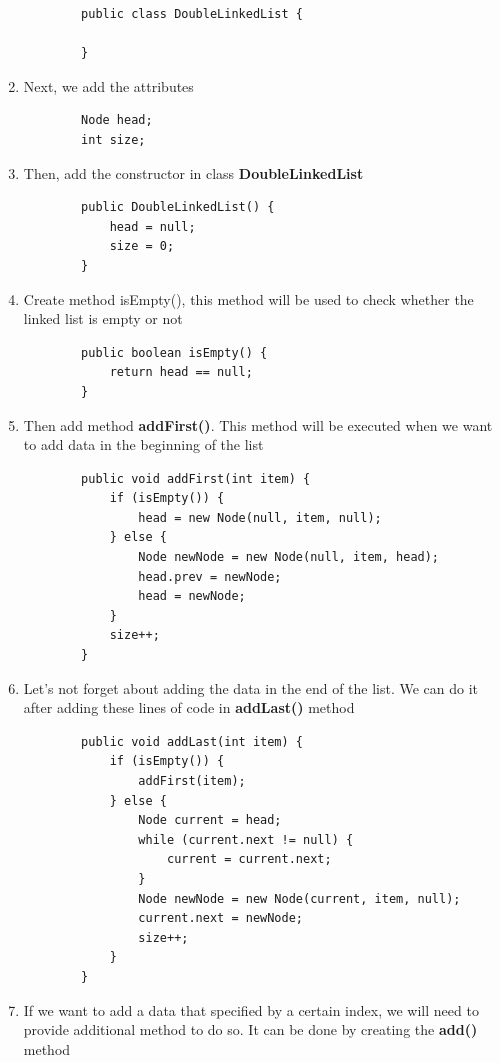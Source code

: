 \documentclass[12pt,titlepage]{article}
\begin{document}
\begin{enumerate}
\begin{verbatim}
        public class DoubleLinkedList {
        
        }
    \end{verbatim}
    \item Next, we add the attributes
    \begin{verbatim}
        Node head;
        int size;
    \end{verbatim}
    \item Then, add the constructor in class \textbf{DoubleLinkedList}
    \begin{verbatim}
        public DoubleLinkedList() {
            head = null;
            size = 0;
        }
    \end{verbatim}
    \item Create method isEmpty(), this method will be used to check whether the linked list is empty or not
    \begin{verbatim}
        public boolean isEmpty() {
            return head == null;
        }
    \end{verbatim}
    \item Then add method \textbf{addFirst()}. This method will be executed when we want to add data in the beginning of the list
    \begin{verbatim}
        public void addFirst(int item) {
            if (isEmpty()) {
                head = new Node(null, item, null);
            } else {
                Node newNode = new Node(null, item, head);
                head.prev = newNode;
                head = newNode;
            }
            size++;
        }
    \end{verbatim}
    \item Let’s not forget about adding the data in the end of the list. We can do it after adding these lines of code in \textbf{addLast()} method
    \begin{verbatim}
        public void addLast(int item) {
            if (isEmpty()) {
                addFirst(item);
            } else {
                Node current = head;
                while (current.next != null) {
                    current = current.next;
                }
                Node newNode = new Node(current, item, null);
                current.next = newNode;
                size++;
            }
        }
    \end{verbatim}
    \item If we want to add a data that specified by a certain index, we will need to provide additional method to do so. It can be done by creating the \textbf{add()} method

\end{enumerate}
\end{document}
